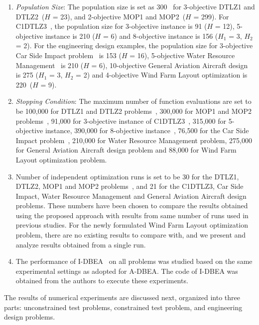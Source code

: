 \begin{enumerate}
	\item \textit{Population Size}: The population size is set as 300~\cite{Wang2016adaptive} for 3-objective DTLZ1 and DTLZ2~($H$ = 23),  and 2-objective MOP1 and MOP2~($H$ = 299). For C1DTLZ3~\cite{Deb2014adaptive}, the population size for 3-objective instance is 91 ($H$ = 12), 5-objective instance is 210 ($H$ = 6) and 8-objective instance is 156 ($H_1$ = 3, $H_2$ = 2). For the engineering design examples, the population size for 3-objective Car Side Impact problem~\cite{Deb2014adaptive} is 153 ($H$ = 16), 5-objective Water Resource Management~\cite{Asafmany2015} is 210 ($H$ = 6), 10-objective General Aviation Aircraft design~\cite{Asafmany2015} is 275 ($H_1$ = 3, $H_2$ = 2) and 4-objective Wind Farm Layout optimization is 220~($H$ = 9).
	\item \textit{Stopping Condition}: The maximum number of function evaluations are set to be 100,000 for DTLZ1 and DTLZ2 problems~\cite{Wang2016adaptive}, 300,000 for MOP1 and MOP2 problems~\cite{Wang2016adaptive}, 91,000 for 3-objective instance of C1DTLZ3~\cite{Deb2014adaptive}, 315,000 for 5-objective instance\cite{Li2015dominance}, 390,000 for 8-objective instance~\cite{Li2015dominance}, 76,500 for the Car Side Impact problem~\cite{Deb2014adaptive}, 210,000 for Water Resource Management problem\cite{Asafmany2015}, 275,000 for General Aviation Aircraft design problem and 88,000 for Wind Farm Layout optimization problem.
	\item Number of independent optimization runs is set to be 30 for the DTLZ1, DTLZ2, MOP1 and MOP2 problems~\cite{Wang2016adaptive}, and 21 for the C1DTLZ3, Car Side Impact, Water Resource Management and General Aviation Aircraft design problems. These numbers have been chosen to compare the results obtained using the proposed approach with results from same number of runs used in previous studies. For the newly formulated Wind Farm Layout optimization problem, there are no existing results to compare with, and we present and analyze results obtained from a single run.
	\item The performance of I-DBEA~\cite{Asafmany2015} on all problems was studied based on the same experimental settings as adopted for A-DBEA. The code of I-DBEA was obtained from the authors to execute these experiments.  
\end{enumerate}

The results of numerical experiments are discussed next, organized into three parts: unconstrained test problems, constrained test problem, and engineering design problems. 

